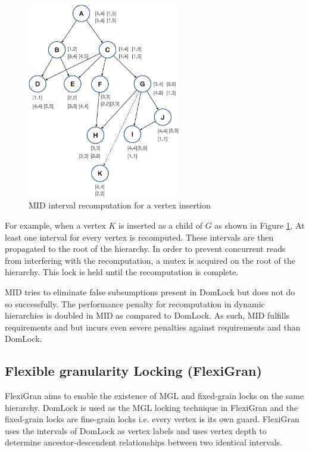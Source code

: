 \begin{figure}[H]
    \centering
    \captionsetup{justification=centering}
    \includegraphics[width=0.6\textwidth]{figures/MID_example_with_SM.png}
    \caption{MID interval recomputation for a vertex insertion}
    \label{fig:MID_example_SM}
    
\end{figure}

For example, when a vertex $K$ is inserted as a child of $G$ as shown in Figure \ref{fig:MID_example_SM}, At least one interval for every vertex is recomputed. These intervals are then propagated to the root of the hierarchy. In order to prevent concurrent reads from interfering with the recomputation, a mutex is acquired on the root of the hierarchy. This lock is held until the recomputation is complete.

MID tries to eliminate false subsumptions present in DomLock but does not do so successfully. The performance penalty for recomputation in dynamic hierarchies is doubled in MID as compared to DomLock. As such, MID fulfills requirements \Ra and \Rb but incurs even severe penalties against requirements \Rc and \Rd than DomLock.

\subsection{Flexible granularity Locking (FlexiGran)}

FlexiGran \cite{FlexiGran2024} aims to enable the existence of MGL and fixed-grain locks on the same hierarchy. 
DomLock is used as the MGL locking technique in FlexiGran and the fixed-grain locks are fine-grain locks i.e. every vertex is its own guard. 
FlexiGran uses the intervals of DomLock  as vertex labels and uses vertex depth to determine ancestor-descendent relationships between two identical intervals.


